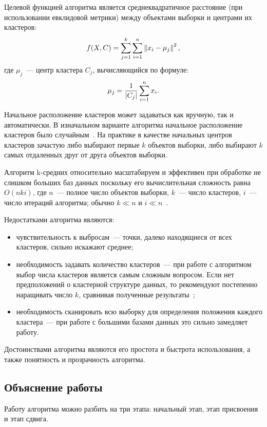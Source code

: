 Целевой функцией алгоритма является среднеквадратичное расстояние (при использовании евклидовой метрики) между объектами выборки и центрами их кластеров:
\[
    f(X, C) = \sum_{j=1}^k \sum_{i=1}^n \left\|x_i - \mu_j\right\|^2,
\]
где \( \mu_j \)~--- центр кластера \( C_j \), вычисляющийся по формуле:
\begin{equation}
    \mu_j = \frac{1}{\left|C_j\right|} \sum_{i=1}^n x_i.
    \label{eq:km-mu}
\end{equation}

Начальное расположение кластеров может задаваться как вручную, так и автоматически. В изначальном варианте алгоритма начальное расположение кластеров было случайным~\cite{macqueen}. На практике в качестве начальных центров кластеров зачастую либо выбирают первые \( k \) объектов выборки, либо выбирают \( k \) самых отдаленных друг от друга объектов выборки.

Алгоритм k-средних относительно масштабируем и эффективен при обработке не слишком больших баз данных поскольку его вычислительная сложность равна \( O(nki) \), где \( n \)~--- полное число объектов выборки, \( k \)~--- число кластеров, \( i \)~--- число итераций алгоритма; обычно \( k\ll n \) и \( i\ll n \)~\cite{cod}.

Недостатками алгоритма являются:
\begin{itemize}
    \item чувствительность к выбросам~--- точки, далеко находящиеся от всех кластеров, сильно искажают среднее;
    \item необходимость задавать количество кластеров~--- при работе с алгоритмом выбор числа кластеров является самым сложным вопросом. Если нет предположений о кластерной структуре данных, то рекомендуют постепенно наращивать число \( k \), сравнивая полученные результаты~\cite{neiskiy};
    \item необходимость сканировать всю выборку для определения положения каждого кластера~--- при работе с большими базами данных это сильно замедляет работу.
\end{itemize}

Достоинствами алгоритма являются его простота и быстрота использования, а также понятность и прозрачность алгоритма.

\subsection{Объяснение работы}
Работу алгоритма можно разбить на три этапа: начальный этап, этап присвоения и этап сдвига.

